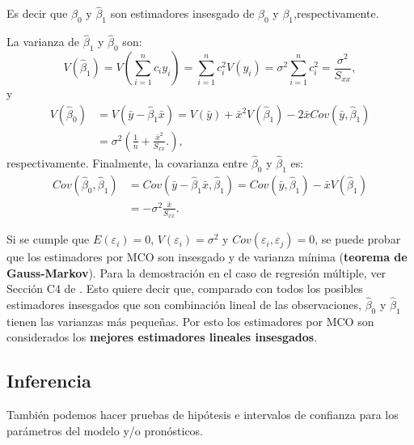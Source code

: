 \documentclass[
]{article}
\begin{document}
Es decir que \(\widehat{\beta}_{0}\) y \(\widehat{\beta}_{1}\) son estimadores insesgado de \(\beta_{0}\) y \(\beta_{1}\),respectivamente.

La varianza de \(\widehat{\beta}_{1}\) y \(\widehat{\beta}_{0}\) son:
\[
V(\widehat{\beta}_{1})= V \left( \sum_{i=1}^{n}c_{i}y_{i}\right) = \sum_{i=1}^{n}c_{i}^{2}V(y_{i}) = \sigma^{2}\sum_{i=1}^{n}c_{i}^{2} = \frac{\sigma^{2}}{S_{xx}},
\]
y
\begin{equation}
\begin{split}
V(\widehat{\beta}_{0}) &= V \left( \bar{y} - \widehat{\beta}_{1}\bar{x}\right) = V (\bar{y}) + \bar{x}^{2}V(\widehat{\beta}_{1}) - 2\bar{x}Cov(\bar{y},\widehat{\beta}_{1}) \\
&= \sigma^{2} \left(\frac{1}{n} + \frac{\bar{x}^{2}}{S_{xx}}. \right),
\end{split}
\nonumber
\end{equation}
respectivamente. Finalmente, la covarianza entre \(\widehat{\beta}_{0}\) y \(\widehat{\beta}_{1}\) es:
\begin{equation}
\begin{split}
Cov(\widehat{\beta}_{0},\widehat{\beta}_{1}) &= Cov\left(\bar{y} - \widehat{\beta}_{1}\bar{x}, \widehat{\beta}_{1} \right) = Cov\left( \bar{y}, \widehat{\beta}_{1}\right) - \bar{x}V\left(\widehat{\beta}_{1}\right) \\
&=  - \sigma^{2}\frac{\bar{x}}{S_{xx}}.
\end{split}
\nonumber
\end{equation}

Si se cumple que \(E(\varepsilon_{i}) = 0\), \(V(\varepsilon_{i}) = \sigma^{2}\) y \(Cov(\varepsilon_{i},\varepsilon_{j})=0\), se puede probar que los estimadores por MCO son insesgado y de varianza mínima (\textbf{teorema de Gauss-Markov}). Para la demostración en el caso de regresión múltiple, ver Sección C4 de \citet{montgomery_introduction_2012}. Esto quiere decir que, comparado con todos los posibles estimadores insesgados que son combinación lineal de las observaciones, \(\widehat{\beta}_{0}\) y \(\widehat{\beta}_{1}\) tienen las varianzas más pequeñas. Por esto los estimadores por MCO son considerados los \textbf{mejores estimadores lineales insesgados}.

\hypertarget{inferencia}{%
\subsection{Inferencia}\label{inferencia}}

También podemos hacer pruebas de hipótesis e intervalos de confianza para los parámetros del modelo y/o pronósticos.
\end{document}
